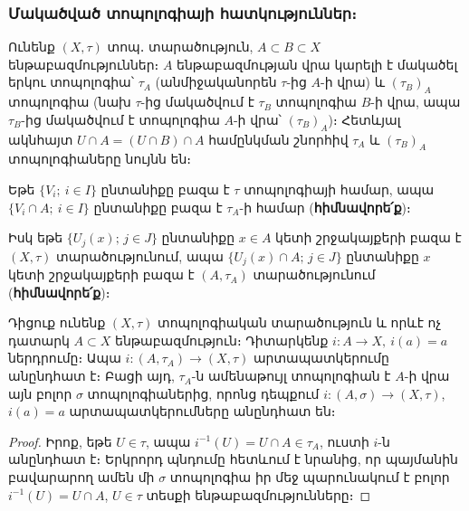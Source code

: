 \documentclass[./main.tex]{subfiles}
\begin{document}
\subsubsection*{Մակածված տոպոլոգիայի հատկություններ։}
\begin{hatkutyun}
Ունենք $(X, \tau)$ տոպ․ տարածություն, $A \subset B \subset X$ են\-թա\-բազ\-մու\-թյուն\-ներ։ $A$ ենթաբազմության վրա կարելի է մակածել երկու տոպոլոգիա՝ $\tau_A$ (անմիջականորեն  $\tau$-ից $A$-ի վրա) և ${(\tau_B)}_A$ տոպոլոգիա (նախ $\tau$-ից մակածվում է $\tau_B$ տոպոլոգիա $B$-ի վրա, ապա $\tau_B$-ից մակածվում է տոպոլոգիա $A$-ի վրա՝ ${(\tau_B)}_A$)։ Հետևյալ ակնհայտ $U \cap  A= (U \cap B) \cap A$ համընկման շնորհիվ $\tau_A$ և ${(\tau_B)}_A$ տոպոլո\-գիա\-ները նույնն են։
\end{hatkutyun} 
\begin{hatkutyun}
Եթե $\{V_i;\ i \in I\}$ ընտանիքը բազա է $\tau$ տոպոլոգիայի համար, ապա $\{V_i \cap A;\ i \in I\}$ ընտանիքը բազա է $\tau_A$-ի համար (\textbf{հիմնավորե՛ք})։
\par Իսկ եթե $\{U_j(x);\, j\in J\}$ ընտանիքը $x\in A$ կետի շրջակայքերի բազա է $(X,\tau)$ տարա\-ծությունում, ապա $\{U_j(x)\cap A;\, j\in J\}$ ընտանիքը $x$ կետի շրջակայքերի բազա է $(A, \tau_A)$ տարածությունում (\textbf{հիմնավորե՛ք})։
\end{hatkutyun} 


\begin{hatkutyun}\label{ch11lem1}
Դիցուք ունենք $(X,\tau)$ տոպոլոգիական տարածություն և որևէ ոչ դատարկ $A\subset X$ ենթաբազմություն։ Դիտարկենք $i:A \rightarrow X,\ i(a)=a$ ներդրու\-մը։ Ապա $i:(A, \tau  _A) \rightarrow (X, \tau)$  ար\-տա\-պատ\-կե\-րումը անընդհատ է։ Բացի այդ, $\tau_A$-ն ամե\-նա\-թույլ տոպոլոգիան է $A$-ի վրա այն բոլոր $\sigma$ տոպոլոգիաներից, որոնց դեպքում ${i : (A, \sigma) \to (X, \tau)}$, $i(a)=a$ արտապատկերումները անընդհատ են։
\end{hatkutyun}

\begin{proof}
Իրոք, եթե $U \in  \tau$, ապա $i^{-1} (U)=U \cap  A \in \tau_A$, ուստի $i$-ն անընդհատ է։ Երկրորդ պնդումը հետևում է նրանից, որ պայմանին բավարարող ամեն մի $\sigma$ տոպո\-լոգիա իր մեջ պարունակում է բոլոր $i^{-1}(U)=U \cap A$, $U \in \tau$ տեսքի ենթա\-բազ\-մու\-թյուն\-նե\-րը։
\end{proof}

\end{document}
